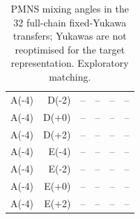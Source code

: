 \begin{table}[htbp]
\begin{tabular}{lrrrrr}
A(-4) & D(-2) & -- & -- & -- & -- \\
A(-4) & D(+0) & -- & -- & -- & -- \\
A(-4) & D(+2) & -- & -- & -- & -- \\
A(-4) & E(-4) & -- & -- & -- & -- \\
A(-4) & E(-2) & -- & -- & -- & -- \\
A(-4) & E(+0) & -- & -- & -- & -- \\
A(-4) & E(+2) & -- & -- & -- & -- \\
\hline
\end{tabular}
\caption{PMNS mixing angles in the 32 full-chain fixed-Yukawa transfers; Yukawas are not reoptimised for the target representation. Exploratory matching.}
\label{tab:generalised_b3}
\end{table}
